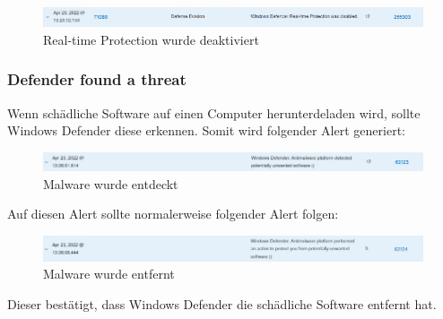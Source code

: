 \begin{figure}[H]
    \centering
    \includegraphics[width=\linewidth]{../img/AV/real-time-protection.png}
    \caption{Real-time Protection wurde deaktiviert}
\end{figure}


\subsubsection{Defender found a threat}
Wenn schädliche Software auf einen Computer herunterdeladen wird, sollte Windows Defender diese erkennen.
Somit wird folgender Alert generiert:
\begin{figure}[H]
    \centering
    \includegraphics[width=\linewidth]{../img/AV/defender-detection.png}
    \caption{Malware wurde entdeckt}
\end{figure}

Auf diesen Alert sollte normalerweise folgender Alert folgen:
\begin{figure}[H]
    \centering
    \includegraphics[width=\linewidth]{../img/AV/defender-removal.png}
    \caption{Malware wurde entfernt}
\end{figure}

Dieser bestätigt, dass Windows Defender die schädliche Software entfernt hat.